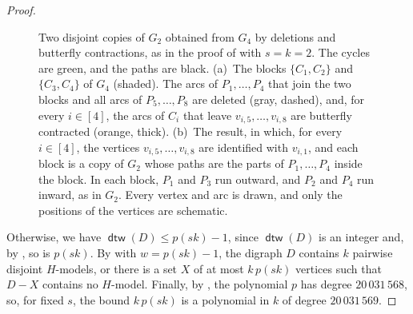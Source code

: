 \documentclass[fontsize=12pt,leading=14pt]{fullpaper}
\DeclareMathOperator{\dtw}{\mathsf{dtw}}
\begin{document}
\begin{proof}
\begin{figure}[ht]
    \caption{Two disjoint copies of $G_2$ obtained from $G_4$ by deletions and butterfly contractions, as in the proof of  with $s=k=2$.
      The cycles are green, and the paths are black.
      (a)~The blocks $\{C_1,C_2\}$ and $\{C_3,C_4\}$ of $G_4$ (shaded).
      The arcs of $P_1,\dots,P_4$ that join the two blocks and all arcs of $P_5,\dots,P_8$ are deleted (gray, dashed), and, for every $i\in[4]$, the arcs of $C_i$ that leave $v_{i,5},\dots,v_{i,8}$ are butterfly contracted (orange, thick).
      (b)~The result, in which, for every $i\in[4]$, the vertices $v_{i,5},\dots,v_{i,8}$ are identified with $v_{i,1}$, and each block is a copy of $G_2$ whose paths are the parts of $P_1,\dots,P_4$ inside the block.
      In each block, $P_1$ and $P_3$ run outward, and $P_2$ and $P_4$ run inward, as in $G_2$.
    Every vertex and arc is drawn, and only the positions of the vertices are schematic.}
    \label{fig:strong-pattern-blocks}
  \end{figure}

  Otherwise, we have $\dtw(D)\le p(sk)-1$, since $\dtw(D)$ is an integer and, by , so is $p(sk)$.
  By  with $w=p(sk)-1$, the digraph $D$ contains $k$ pairwise disjoint $H$-models, or there is a set $X$ of at most $k\,p(sk)$ vertices such that $D-X$ contains no $H$-model.
  Finally, by , the polynomial $p$ has degree $20\,031\,568$, so, for fixed $s$, the bound $k\,p(sk)$ is a polynomial in $k$ of degree $20\,031\,569$.
\end{proof}
\end{document}
